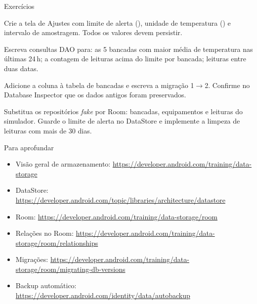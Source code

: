 \documentclass[aspectratio=169,10pt]{beamer}
\begin{document}
\begin{frame}{Exercícios}
  \begin{exercicio}
    Crie a tela de Ajustes com limite de alerta (), unidade de temperatura () e intervalo de amostragem. Todos os valores devem persistir.
  \end{exercicio}
  \begin{exercicio}
    Escreva consultas DAO para: as 5 bancadas com maior média de temperatura nas últimas 24\,h; a contagem de leituras acima do limite por bancada; leituras entre duas datas.
  \end{exercicio}
  \begin{exercicio}
    Adicione a coluna  à tabela de bancadas e escreva a migração 1$\rightarrow$2. Confirme no Database Inspector que os dados antigos foram preservados.
  \end{exercicio}
  \begin{projeto}
    Substitua os repositórios \emph{fake} por Room: bancadas, equipamentos e leituras do simulador. Guarde o limite de alerta no DataStore e implemente a limpeza de leituras com mais de 30 dias.
  \end{projeto}
\end{frame}

\begin{frame}{Para aprofundar}
  \small
  \begin{itemize}
    \item Visão geral de armazenamento: \url{https://developer.android.com/training/data-storage}
    \item DataStore: \url{https://developer.android.com/topic/libraries/architecture/datastore}
    \item Room: \url{https://developer.android.com/training/data-storage/room}
    \item Relações no Room: \url{https://developer.android.com/training/data-storage/room/relationships}
    \item Migrações: \url{https://developer.android.com/training/data-storage/room/migrating-db-versions}
    \item Backup automático: \url{https://developer.android.com/identity/data/autobackup}
  \end{itemize}
\end{frame}
\end{document}
